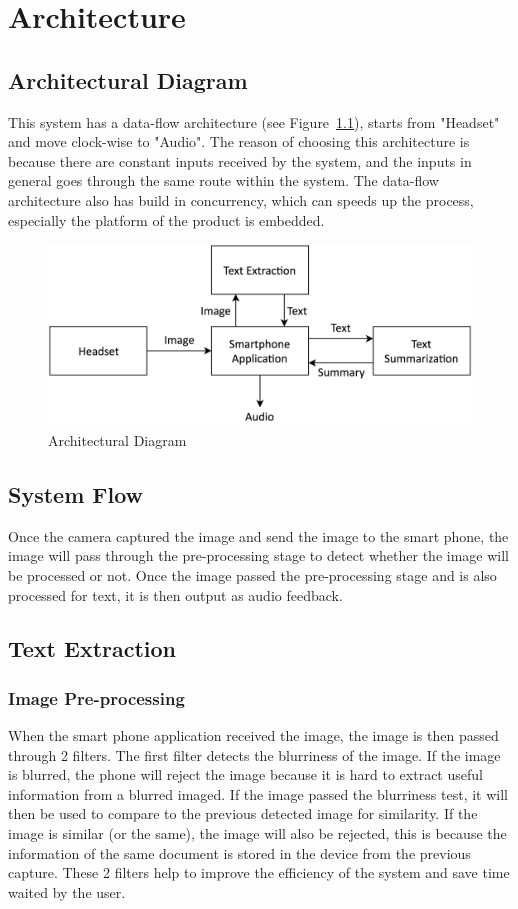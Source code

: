 \chapter{Architecture}
\section{Architectural Diagram}
This system has a data-flow architecture (see Figure~\ref{architectualDiagram}), starts from "Headset" and move clock-wise to "Audio". The reason of choosing this architecture is because there are constant inputs received by the system, and the inputs in general goes through the same route within the system. The data-flow architecture also has build in concurrency, which can speeds up the process, especially the platform of the product is embedded.
\begin{figure}
	\label{architectualDiagram}
	\centering
    \includegraphics[scale = 0.2]{ArchitectureDiagram.png}
    
    \caption{Architectural Diagram}
\end{figure}

\section{System Flow}
Once the camera captured the image and send the image to the smart phone, the image will pass through the pre-processing stage to detect whether the image will be processed or not. Once the image passed the pre-processing stage and is also processed for text, it is then output as audio feedback.

\section{Text Extraction}
\subsection{Image Pre-processing}
When the smart phone application received the image, the image is then passed through 2 filters. The first filter detects the blurriness of the image. If the image is blurred, the phone will reject the image because it is hard to extract useful information from a blurred imaged. If the image passed the blurriness test, it will then be used to compare to the previous detected image for similarity. If the image is similar (or the same), the image will also be rejected, this is because the information of the same document is stored in the device from the previous capture. These 2 filters help to improve the efficiency of the system and save time waited by the user.

